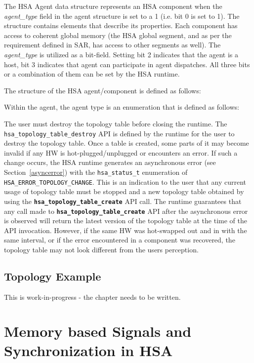 \documentclass{book}
\newcommand{\diffblock}[1]{#1}
\newcommand{\ttbf}[1]{\diffblock{\texttt{\textbf{#1}}}}
\newcommand{\dbtt}[1]{\diffblock{\texttt{#1}}}
\begin{document}
The HSA Agent data structure represents an HSA component when the
{\itshape agent\_type} field in the agent structure is set to a 1
(i.e. bit 0 is set to 1).
The structure contains elements that describe its properties. Each
component has access to coherent global memory (the HSA global
segment, and as per the requirement defined in SAR, has access to
other segments as well). The {\itshape agent\_type} is utilized as a
bit-field. Setting bit 2 indicates that the agent is a host, bit 3
indicates that agent can participate in agent dispatches. All
three bits or a combination of them can be set by the HSA runtime.

The structure of the HSA agent/component is defined as follows:


Within the agent, the agent type is an enumeration that is defined
as follows:


The user must destroy the topology table before closing the runtime.
The \dbtt{hsa\_topology\_table\_destroy} API is defined by the
runtime for the user to destroy the topology table. Once a table is
created, some parts of it may become invalid if any HW is
hot-plugged/unplugged or encounters an error. If such a change
occurs, the HSA runtime generates an asynchronous error (see
Section~\ref{asyncerror}) with the \dbtt{hsa\_status\_t} enumeration
of \dbtt{HSA\_ERROR\_TOPOLOGY\_CHANGE}. This is an indication to the
user that any current usage of topology table must be stopped and a
new topology table obtained by using the
\ttbf{hsa\_topology\_table\_create} API call. The runtime guarantees
that any call made to \ttbf{hsa\_topology\_table\_create} API after
the asynchronous error is observed will return the latest version of
the topology table at the time of the API invocation. However, if
the same HW was hot-swapped out and in with the same interval, or if
the error encountered in a component was recovered, the topology
table may not look different from the users perception.

\hypertarget{topology_example}{} \subsection{Topology Example}
This is {\color{red} work-in-progress} - the chapter needs to be written.

\hypertarget{signals}{}\section{Memory based Signals and
Synchronization in H\-S\-A}\label{signals}
\end{document}
